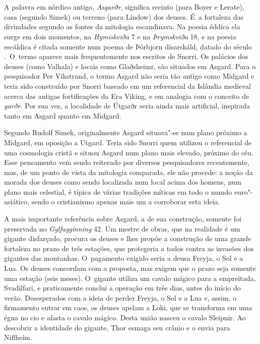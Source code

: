\section{}

A palavra em nórdico antigo, \emph{Asgarðr}, significa recinto (para
Boyer e Lerate), casa (segundo Simek) ou terreno (para Lindow) dos
deuses. É~a fortaleza das divindades segundo as fontes da mitologia
escandinava. Na poesia éddica ela surge em dois momentos, na
\emph{Hymiskviða} 7 e na \emph{Þrymskviða} 18, e na poesia escáldica é
citada somente num poema de Þórbjorn dísarskáld, datado do século .~O~termo 
aparece mais frequentemente nos escritos de Snorri. Os palácios
dos deuses (como Valhala) e locais como Glaðsheimr, são situados em
Asgard. Para o pesquisador Per Vikstrand, o termo Asgard não seria tão
antigo como Midgard e teria sido construído por Snorri baseado em um
referencial da Islândia medieval acerca das antigas fortificações da Era
Viking, e em analogia com o conceito de \emph{garðr}. Por sua vez, a
localidade de Útgarðr seria ainda mais artificial, inspirada tanto em
Asgard quanto em Midgard.

Segundo Rudolf Simek, originalmente Asgard situava"-se num plano próximo
a Midgard, em oposição a Utgard. Teria sido Snorri quem utilizou o
referencial de uma cosmologia cristã e situou Asgard num plano mais
elevado, próximo do céu. Esse pensamento vem sendo reiterado por
diversos pesquisadores recentemente, mas, de um ponto de vista da
mitologia comparada, ele não procede: a noção da morada dos deuses como
sendo localizada num local acima dos homens, num plano mais celestial, é
típica de várias tradições míticas em todo o mundo euro"-asiático, sendo
o cristianismo apenas mais um a corroborar esta ideia.

A mais importante referência sobre Asgard, a de sua construção, somente
foi preservada no \emph{Gylfagginning} 42. Um mestre de obras, que na
realidade é um gigante disfarçado, procura os deuses e lhes propõe a
construção de uma grande fortaleza no prazo de três estações, que
protegeria a todos contra as invasões dos gigantes das montanhas. O~pagamento 
exigido seria a deusa Freyja, o Sol e a Lua. Os deuses
concordam com a proposta, mas exigem que o prazo seja somente uma
estação (seis meses). O~gigante utiliza um cavalo mágico para a
empreitada, Svadilfari, e praticamente conclui a operação em três dias,
antes do início do verão. Desesperados com a ideia de perder Freyja, o
Sol e a Lua e, assim, o firmamento entrar em caos, os deuses apelam a
Loki, que se transforma em uma égua no cio e afasta o cavalo mágico.
Desta união nasceu o cavalo Sleipnir. Ao descobrir a identidade do
gigante, Thor esmaga seu crânio e o envia para Niflheim.


